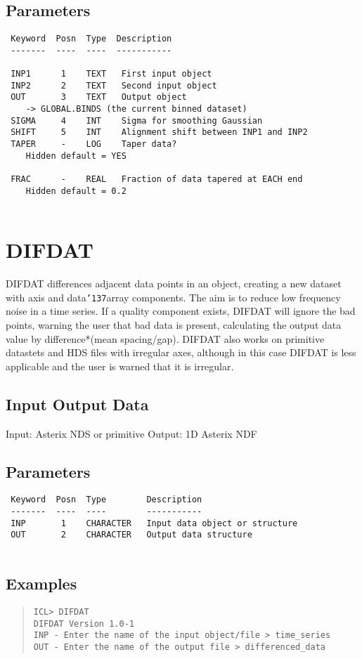 \documentclass{book}
\renewcommand{\_}{{\tt\char'137}}     %
\begin{document}
\subsection{Parameters}
\begin{verbatim}
 Keyword  Posn  Type  Description
 -------  ----  ----  -----------
 
 INP1      1    TEXT   First input object
 INP2      2    TEXT   Second input object
 OUT       3    TEXT   Output object
    -> GLOBAL.BINDS (the current binned dataset)
 SIGMA     4    INT    Sigma for smoothing Gaussian
 SHIFT     5    INT    Alignment shift between INP1 and INP2
 TAPER     -    LOG    Taper data?
    Hidden default = YES
 
 FRAC      -    REAL   Fraction of data tapered at EACH end
    Hidden default = 0.2
 
\end{verbatim}\section{DIFDAT}
DIFDAT differences adjacent data points in an object, creating
a new dataset with axis and data\_array components. The
aim is to reduce low frequency noise in a time series. If a
quality component exists, DIFDAT will ignore the bad points,
warning the user that bad data is present, calculating the
output data value by difference*(mean spacing/gap). DIFDAT
also works on primitive datastets and HDS files with irregular
axes, although in this case DIFDAT is less applicable and the
user is warned that it is irregular.
\subsection{Input Output Data}
Input: Asterix NDS or primitive
Output: 1D Asterix NDF
\subsection{Parameters}
\begin{verbatim}
 Keyword  Posn  Type        Description
 -------  ----  ----        -----------
 INP       1    CHARACTER   Input data object or structure
 OUT       2    CHARACTER   Output data structure
 
\end{verbatim}\subsection{Examples}
\begin{quote}\begin{verbatim}
ICL> DIFDAT
DIFDAT Version 1.0-1
INP - Enter the name of the input object/file > time_series
OUT - Enter the name of the output file > differenced_data
\end{verbatim}\end{quote}
\end{document}
